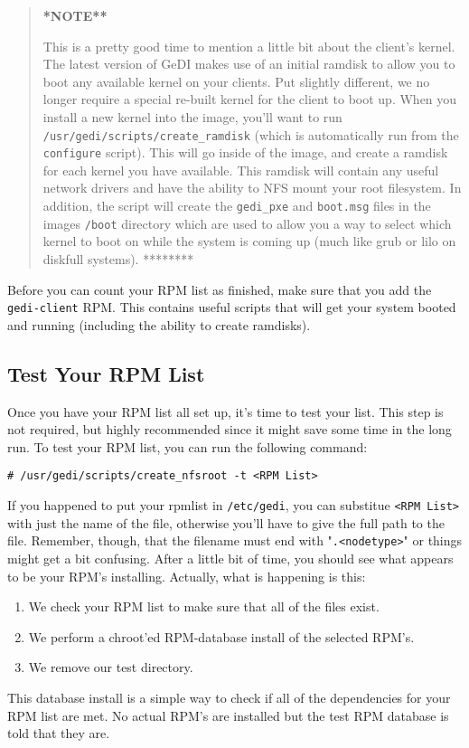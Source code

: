 \documentclass[10pt,a4paper,titlepage]{article}
\begin{document}
\begin{quote}
\bf**NOTE**\par
This is a pretty good time to mention a little bit about the client's kernel.
The latest version of GeDI makes use of an initial ramdisk to allow you to boot
any available kernel on your clients.  Put slightly different, we no longer
require a special re-built kernel for the client to boot up.  When you install
a new kernel into the image, you'll want to run
\verb!/usr/gedi/scripts/create_ramdisk! (which is automatically run from the
\verb!configure! script).  This will go inside of the image, and create a
ramdisk for each kernel you have available.  This ramdisk will contain any
useful network drivers and have the ability to NFS mount your root filesystem.
In addition, the script will create the \verb!gedi_pxe! and \verb!boot.msg!
files in the images \verb!/boot! directory which are used to allow you a way
to select which kernel to boot on while the system is coming up (much like
grub or lilo on diskfull systems).
********
\end{quote}

Before you can count your RPM list as finished, make sure that you add the
\verb!gedi-client! RPM.  This contains useful scripts that will get your system
booted and running (including the ability to create ramdisks).

\subsection{Test Your RPM List}
Once you have your RPM list all set up, it's time to test your list.  This step
is not required, but highly recommended since it might save some time in the
long run.  To test your RPM list, you can run the following command:

\begin{verbatim}
# /usr/gedi/scripts/create_nfsroot -t <RPM List>
\end{verbatim}

If you happened to put your rpmlist in \verb!/etc/gedi!, you can substitue
\verb!<RPM List>! with just the name of the file, otherwise you'll have to give
the full path to the file.  Remember, though, that the filename must end with
"\verb!.<nodetype>!" or things might get a bit confusing.  After a little bit
of time, you should see what appears to be your RPM's installing.  Actually,
what is happening is this:
\begin{enumerate}
\parskip=0pt
\item We check your RPM list to make sure that all of the files exist.
\item We perform a chroot'ed RPM-database install of the selected RPM's.
\item We remove our test directory.
\end{enumerate}
This database install is a simple way to check if all of the dependencies for
your RPM list are met.  No actual RPM's are installed but the test RPM database
is told that they are.
\end{document}
